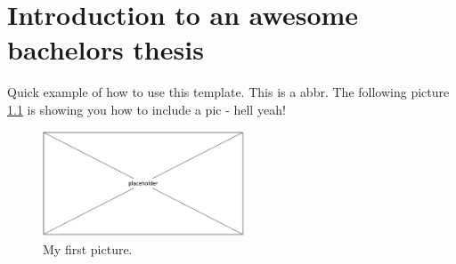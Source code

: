 
\chapter{Introduction to an awesome bachelors thesis}
Quick example of how to use this template. This is a \ac{abbr}. The following picture \ref{pic} is showing you how to include a pic - hell yeah! 

\begin{figure}
\centering
	\includegraphics[width=6cm]{placeholder.png} 	
\caption{My first picture.}
\label{pic}
\end{figure}


  


